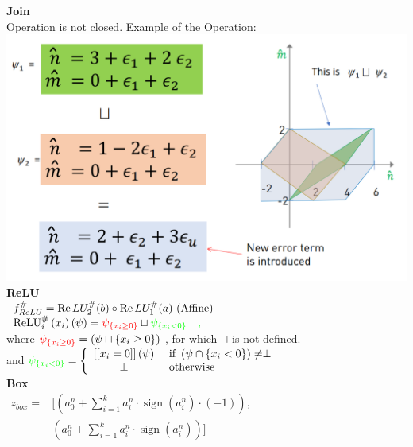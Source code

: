 \documentclass[11pt]{extarticle}
\begin{document}
\begin{multicols*}{3}
			\textbf{Join}\\
			Operation is not closed. Example of the Operation:\\
			\includegraphics[width=\linewidth]{join_polytope.png}\\
			\textbf{ReLU}\\
			$\begin{array} { l l }
			{ f _ { R e L U } ^ { \# } = \operatorname { Re } L U _ { 2 } ^ { \# } ( b ) \circ \operatorname { Re } L U _ { 1 } ^ { \# } ( a ) \text { (Affine) } } \\
			\operatorname {ReLU} _ { i } ^ { \# } \left( x _ { i } \right) ( \psi ) =
			\mathbin{\textcolor{red} {\psi_ { \left\{ x _ { i } \geq 0 \right\}}}}
			\sqcup  \mathbin{\textcolor{green}{\psi _ {\left\{ x _ { i } < 0 \right\}} \quad \text{,} }}
			\end{array} $ \\
			where
			$  \mathbin{\textcolor{red} {\psi_ { \left\{ x _ { i } \geq 0 \right\}}}} = 
			\left( \psi \sqcap \left\{ x _ { i } \geq 0 \right\} \right)$ , for which $\sqcap$ is not defined.\\
			and
			$ \mathbin{\textcolor{green}{\psi _ {\left\{ x_{ i } < 0 \right\}} }} = \left\{ \begin{array}{ c l } { \left[ \left[ x _ { i } = 0 \right] \right] ( \psi ) } & { \text { if } \left( \psi \cap \left\{ x _ { i } < 0 \right\} \right) \neq \perp } \\ { \perp } & { \text { otherwise } } \end{array} \right.$\\
			
			\newpage
			\textbf{Box}\\
			$\begin{aligned}
			z_{box} = & \Bigg[ 
			\left( a _ { 0 } ^ { n } + \sum _ { i = 1 } ^ { k } a _ { i } ^ { n } \cdot {\operatorname{sign}}(a _ { i } ^ { n })\cdot (-1)  \right), \\
			& \left( a _ { 0 } ^ { n } + \sum _ { i = 1 } ^ { k } a _ { i } ^ { n } \cdot {\operatorname{sign}} (a _ { i } ^ { n }) \right) \Bigg]
			\end{aligned}$
			

\end{multicols*}
\end{document}
